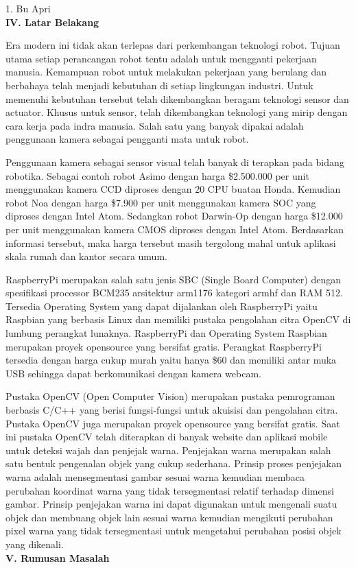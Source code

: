 \documentclass[a4paper,12pt]{article}
\begin{document}
1. Bu Apri
\\[10pt]
\noindent \textbf{IV. \hspace{9pt} Latar Belakang} 

Era modern ini tidak akan terlepas dari perkembangan teknologi robot.
Tujuan utama setiap perancangan robot tentu adalah untuk mengganti pekerjaan manusia.
Kemampuan robot untuk melakukan pekerjaan yang berulang dan berbahaya telah menjadi kebutuhan di setiap lingkungan industri. 
Untuk memenuhi kebutuhan tersebut telah dikembangkan beragam teknologi sensor dan actuator.
Khusus untuk sensor, telah dikembangkan teknologi yang mirip dengan cara kerja pada indra manusia.
Salah satu yang banyak dipakai adalah penggunaan kamera sebagai pengganti mata untuk robot.

Penggunaan kamera sebagai sensor visual telah banyak di terapkan pada bidang robotika.
Sebagai contoh robot Asimo dengan harga \$2.500.000 per unit menggunakan kamera CCD diproses dengan 20 CPU buatan Honda.
Kemudian robot Noa dengan harga \$7.900 per unit menggunakan kamera SOC yang diproses dengan Intel Atom. 
Sedangkan robot Darwin-Op dengan harga \$12.000 per unit menggunakan kamera CMOS diproses dengan Intel Atom. 
Berdasarkan informasi tersebut, maka harga tersebut masih tergolong mahal untuk aplikasi skala rumah dan kantor secara umum.

RaspberryPi merupakan salah satu jenis SBC (Single Board Computer) dengan spesifikasi processor BCM235 arsitektur arm1176 kategori armhf dan RAM 512.
Tersedia Operating System yang dapat dijalankan oleh RaspberryPi yaitu Raspbian yang berbasis Linux dan memiliki pustaka pengolahan citra OpenCV di lumbung perangkat lunaknya.
RaspberryPi dan Operating System Raspbian merupakan proyek opensource yang bersifat gratis.
Perangkat RaspberryPi tersedia dengan harga cukup murah yaitu hanya \$60 dan memiliki antar muka USB sehingga dapat berkomunikasi dengan kamera webcam.

Pustaka OpenCV (Open Computer Vision) merupakan pustaka pemrograman berbasis C/C++ yang berisi fungsi-fungsi untuk akuisisi dan pengolahan citra.
Pustaka OpenCV juga merupakan proyek opensource yang bersifat gratis.
Saat ini pustaka OpenCV telah diterapkan di banyak website dan aplikasi mobile untuk deteksi wajah dan penjejak warna.
Penjejakan warna merupakan salah satu bentuk pengenalan objek yang cukup sederhana. 
Prinsip proses penjejakan warna adalah mensegmentasi gambar sesuai warna kemudian membaca perubahan koordinat warna yang tidak tersegmentasi relatif terhadap dimensi gambar.
Prinsip penjejakan warna ini dapat digunakan untuk mengenali suatu objek dan membuang objek lain sesuai warna kemudian mengikuti perubahan pixel warna yang tidak tersegmentasi untuk mengetahui perubahan posisi objek yang dikenali.
\\[10pt]
\noindent \textbf{V. \hspace{10pt} Rumusan Masalah}
\end{document}
